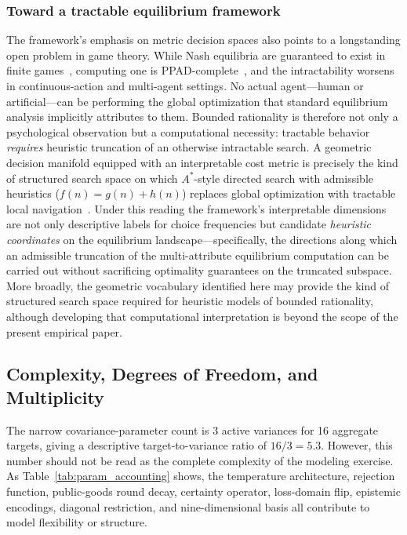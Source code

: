 \documentclass[journal]{IEEEtran}
\begin{document}
\subsubsection*{Toward a tractable equilibrium framework}
The framework's emphasis on metric decision spaces also points to a longstanding open problem in game theory. While Nash equilibria are guaranteed to exist in finite games~\cite{nash1950}, computing one is PPAD-complete~\cite{daskalakis2009,chen2009}, and the intractability worsens in continuous-action and multi-agent settings. No actual agent---human or artificial---can be performing the global optimization that standard equilibrium analysis implicitly attributes to them. Bounded rationality is therefore not only a psychological observation but a computational necessity: tractable behavior \emph{requires} heuristic truncation of an otherwise intractable search.
A geometric decision manifold equipped with an interpretable cost metric is precisely the kind of structured search space on which $A^*$-style directed search with admissible heuristics ($f(n)=g(n)+h(n)$) replaces global optimization with tractable local navigation~\cite{hart1968}. Under this reading the framework's interpretable dimensions are not only descriptive labels for choice frequencies but candidate \emph{heuristic coordinates} on the equilibrium landscape---specifically, the directions along which an admissible truncation of the multi-attribute equilibrium computation can be carried out without sacrificing optimality guarantees on the truncated subspace. More broadly, the geometric vocabulary identified here may provide the kind of structured search space required for heuristic models of bounded rationality, although developing that computational interpretation is beyond the scope of the present empirical paper.

\subsection{Complexity, Degrees of Freedom, and Multiplicity}

The narrow covariance-parameter count is 3 active variances for 16 aggregate targets, giving a descriptive target-to-variance ratio of $16/3=5.3$.
However, this number should not be read as the complete complexity of the modeling exercise.
As Table~\ref{tab:param_accounting} shows, the temperature architecture, rejection function, public-goods round decay, certainty operator, loss-domain flip, epistemic encodings, diagonal restriction, and nine-dimensional basis all contribute to model flexibility or structure.
\end{document}
